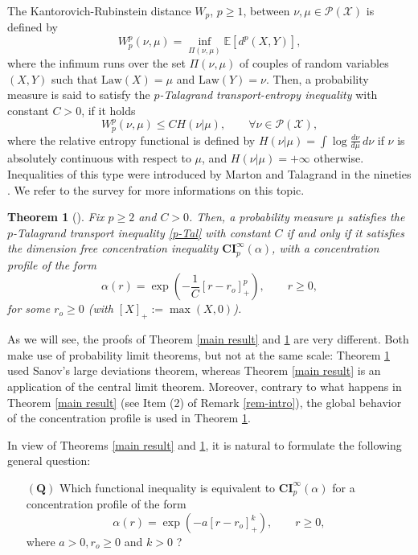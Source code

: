 \documentclass[11pt]{amsart}
\newtheorem{thm}[equation]{Theorem}
\numberwithin{equation}{section}
\begin{document}
The Kantorovich-Rubinstein distance $W_p$, $p\geq1$, between $\nu,\mu \in \mathcal{P}({\mathcal{X}})$ is defined by
$$
W_p^p(\nu,\mu)=\inf_{\Pi(\nu,\mu)} {\mathbb{E}}[d^p(X,Y)],
$$
where the infimum runs over the set $\Pi(\nu,\mu)$ of couples of random variables $(X,Y)$ such that $\mathrm{Law}(X)=\mu$ and $\mathrm{Law}(Y)=\nu$. Then, a probability measure is said to satisfy the \emph{$p$-Talagrand transport-entropy inequality} with constant $C>0$, if it holds
\begin{equation}\label{p-Tal}
W_p^p(\nu,\mu) \leq CH(\nu|\mu),\qquad \forall \nu \in \mathcal{P}({\mathcal{X}}),
\end{equation}
where the relative entropy functional is defined by $H(\nu|\mu)=\int \log \frac{d\nu}{d\mu}\,d\nu$ if $\nu$ is absolutely continuous with respect to $\mu$, and $H(\nu|\mu)=+\infty$ otherwise. Inequalities of this type were introduced by Marton and Talagrand in the nineties \cite{M86,Tal96}. We refer to the survey \cite{GL10} for more informations on this topic.
\begin{thm}[\cite{Goz09}] \label{thm:Goz09}
Fix $p\geq2$ and $C>0$. Then, a  probability measure $\mu$ satisfies the $p$-Talagrand transport inequality \eqref{p-Tal} with constant $C$ if and only if it satisfies the dimension free concentration inequality $\mathbf{CI}_p^\infty(\alpha)$, with a concentration profile of the form
\[
\alpha(r)=\exp\left(-\frac{1}{C} [r-r_o]_+^p\right),\qquad r\geq0,
\]
for some $r_o\geq0$ (with  $[X]_+:=\max(X,0)$).
\end{thm}
As we will see, the proofs of Theorem  \ref{main result} and \ref{thm:Goz09} are very different. Both make use of probability limit theorems, but not at the same scale: Theorem \ref{thm:Goz09} used Sanov's large deviations theorem, whereas Theorem \ref{main result} is an application of the central limit theorem. Moreover, contrary to what happens in Theorem \ref{main result} (see Item (2) of Remark \ref{rem-intro}), the global behavior of the concentration profile is used in Theorem \ref{thm:Goz09}.

In view of Theorems \ref{main result} and \ref{thm:Goz09}, it is natural to formulate the following general question:
\begin{itemize}
\item[$\mathbf{(Q)}$] Which functional inequality is equivalent to $\mathbf{CI}_p^\infty(\alpha)$ for a concentration profile of the form
\[
\alpha(r)=\exp(-a[r-r_o]^k_+),\qquad r\geq0,
\]where $a>0,r_o\geq0$ and $k>0$ ?
\end{itemize}
\end{document}
